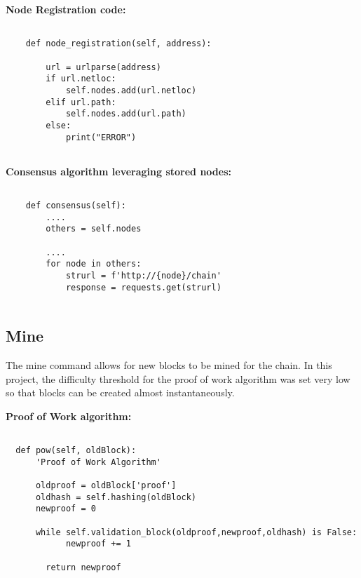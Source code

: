 \bigskip
\noindent
\textbf{Node Registration code:}
\begin{footnotesize}
\begin{verbatim}

    def node_registration(self, address):

        url = urlparse(address)
        if url.netloc:
            self.nodes.add(url.netloc)
        elif url.path:
            self.nodes.add(url.path)
        else:
            print("ERROR")
        
\end{verbatim}
\end{footnotesize}


\bigskip
\noindent
\textbf{Consensus algorithm leveraging stored nodes:}
\begin{footnotesize}
\begin{verbatim}

    def consensus(self):
        ....
        others = self.nodes
        
        ....
        for node in others:
            strurl = f'http://{node}/chain'
            response = requests.get(strurl)
        
\end{verbatim}
\end{footnotesize}

\subsection{Mine}

The mine command allows for new blocks to be mined for the chain. In
this project, the difficulty threshold for the proof of work algorithm
was set very low so that blocks can be created almost instantaneously.

\bigskip
\noindent
\textbf{Proof of Work algorithm:}
\begin{footnotesize}
\begin{verbatim}

  def pow(self, oldBlock):
      'Proof of Work Algorithm'

      oldproof = oldBlock['proof']
      oldhash = self.hashing(oldBlock)
      newproof = 0

      while self.validation_block(oldproof,newproof,oldhash) is False:
            newproof += 1

        return newproof
        
\end{verbatim}
\end{footnotesize}

